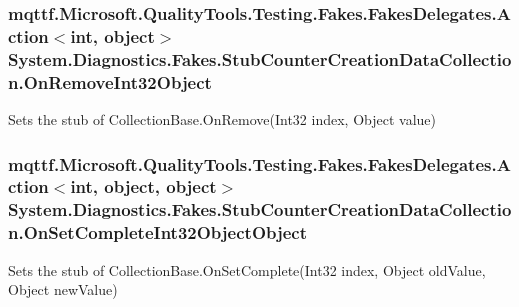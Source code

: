 \hypertarget{class_system_1_1_diagnostics_1_1_fakes_1_1_stub_counter_creation_data_collection_afb8c8e9e3195aa890611b53b2dd6eff6}{
\subsubsection[{On\-Remove\-Int32\-Object}]{\setlength{\rightskip}{0pt plus 5cm}mqttf.\-Microsoft.\-Quality\-Tools.\-Testing.\-Fakes.\-Fakes\-Delegates.\-Action$<$int, object$>$ System.\-Diagnostics.\-Fakes.\-Stub\-Counter\-Creation\-Data\-Collection.\-On\-Remove\-Int32\-Object}}\label{class_system_1_1_diagnostics_1_1_fakes_1_1_stub_counter_creation_data_collection_afb8c8e9e3195aa890611b53b2dd6eff6}


Sets the stub of Collection\-Base.\-On\-Remove(\-Int32 index, Object value)

\hypertarget{class_system_1_1_diagnostics_1_1_fakes_1_1_stub_counter_creation_data_collection_a331ab801d74682efcaca2f9ecfc1cb85}{
\subsubsection[{On\-Set\-Complete\-Int32\-Object\-Object}]{\setlength{\rightskip}{0pt plus 5cm}mqttf.\-Microsoft.\-Quality\-Tools.\-Testing.\-Fakes.\-Fakes\-Delegates.\-Action$<$int, object, object$>$ System.\-Diagnostics.\-Fakes.\-Stub\-Counter\-Creation\-Data\-Collection.\-On\-Set\-Complete\-Int32\-Object\-Object}}\label{class_system_1_1_diagnostics_1_1_fakes_1_1_stub_counter_creation_data_collection_a331ab801d74682efcaca2f9ecfc1cb85}


Sets the stub of Collection\-Base.\-On\-Set\-Complete(\-Int32 index, Object old\-Value, Object new\-Value)

